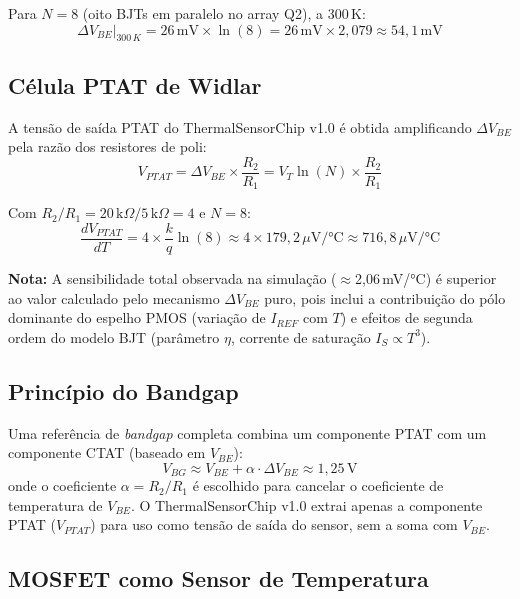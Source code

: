 \documentclass[12pt,a4paper]{article}
\begin{document}
Para $N=8$ (oito BJTs em paralelo no array Q2), a 300\,K:
\begin{equation}
  \Delta V_{BE}|_{300\,K} = 26\,\text{mV} \times \ln(8)
    = 26\,\text{mV} \times 2{,}079 \approx 54{,}1\,\text{mV}
\end{equation}

\subsection{Célula PTAT de Widlar}

A tensão de saída PTAT do ThermalSensorChip v1.0 é obtida amplificando $\Delta V_{BE}$
pela razão dos resistores de poli:
\begin{equation}
  V_{PTAT} = \Delta V_{BE} \times \frac{R_2}{R_1}
    = V_T \ln(N) \times \frac{R_2}{R_1}
  \label{eq:vptat}
\end{equation}

Com $R_2/R_1 = 20\,\text{k}\Omega / 5\,\text{k}\Omega = 4$ e $N=8$:
\begin{equation}
  \frac{dV_{PTAT}}{dT} = 4 \times \frac{k}{q}\ln(8)
    \approx 4 \times 179{,}2\,\mu\text{V/°C} \approx 716{,}8\,\mu\text{V/°C}
\end{equation}

\noindent\textbf{Nota:} A sensibilidade total observada na simulação ($\approx$2,06\,mV/°C) é
superior ao valor calculado pelo mecanismo $\Delta V_{BE}$ puro, pois inclui a contribuição
do pólo dominante do espelho PMOS (variação de $I_{REF}$ com $T$) e efeitos de segunda ordem
do modelo BJT (parâmetro $\eta$, corrente de saturação $I_S \propto T^3$).

\subsection{Princípio do Bandgap}

Uma referência de \textit{bandgap} completa combina um componente PTAT com um componente
CTAT (baseado em $V_{BE}$):
\begin{equation}
  V_{BG} \approx V_{BE} + \alpha \cdot \Delta V_{BE} \approx 1{,}25\,\text{V}
\end{equation}
onde o coeficiente $\alpha = R_2/R_1$ é escolhido para cancelar o coeficiente de temperatura
de $V_{BE}$. O ThermalSensorChip v1.0 extrai apenas a componente PTAT ($V_{PTAT}$) para uso
como tensão de saída do sensor, sem a soma com $V_{BE}$.

\subsection{MOSFET como Sensor de Temperatura}
\end{document}
